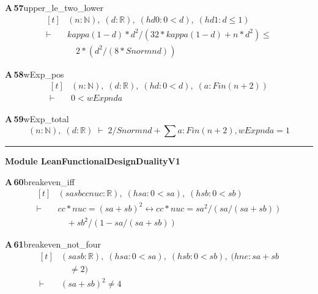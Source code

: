 \documentclass[conference]{IEEEtran}
\theoremstyle{definition}
\newcommand{\lean}[1]{\textsf{\footnotesize #1}}
\begin{document}
\noindent\textbf{A\,57}\quad\lean{upper\_le\_two\_lower}
{\footnotesize\[ \begin{aligned}[t]
&(\mathit{n} : \mathbb{N} ),\; (\mathit{d} : \mathbb{R} ),\; (\mathit{hd0} : 0 < \mathit{d}),\; (\mathit{hd1} : \mathit{d} \leq 1)\\
\vdash\;&\mathit{kappa} (1-\mathit{d})*\mathit{d}^{2}/(32*\mathit{kappa} (1-\mathit{d}) + \mathit{n}*\mathit{d}^{2}) \leq\\
&\quad 2*(\mathit{d}^{2}/(8*\mathit{Snorm} \mathit{n} \mathit{d}))
\end{aligned} \]}

\noindent\textbf{A\,58}\quad\lean{wExp\_pos}
{\footnotesize\[ \begin{aligned}[t]
&(\mathit{n} : \mathbb{N} ),\; (\mathit{d} : \mathbb{R} ),\; (\mathit{hd} : 0 < \mathit{d}),\; (\mathit{a} : \mathit{Fin} (\mathit{n}+2))\\
\vdash\;&0 < \mathit{wExp} \mathit{n} \mathit{d} \mathit{a}
\end{aligned} \]}

\noindent\textbf{A\,59}\quad\lean{wExp\_total}
{\footnotesize\[ (\mathit{n} : \mathbb{N} ),\; (\mathit{d} : \mathbb{R} ) \;\vdash\; 2/\mathit{Snorm} \mathit{n} \mathit{d} + \textstyle\sum \mathit{a} : \mathit{Fin} (\mathit{n}+2), \mathit{wExp} \mathit{n} \mathit{d} \mathit{a} = 1 \]}

\vspace{4pt}\noindent\rule{\columnwidth}{0.4pt}\par\vspace{2pt}
\noindent\textbf{Module \lean{LeanFunctionalDesignDualityV1}}\par\vspace{3pt}

\noindent\textbf{A\,60}\quad\lean{breakeven\_iff}
{\footnotesize\[ \begin{aligned}[t]
&(\mathit{sa} \mathit{sb} \mathit{cc} \mathit{nuc} : \mathbb{R} ),\; (\mathit{hsa} : 0 < \mathit{sa}),\; (\mathit{hsb} : 0 < \mathit{sb})\\
\vdash\;&\mathit{cc} * \mathit{nuc} = (\mathit{sa} + \mathit{sb}) ^{2} \leftrightarrow \mathit{cc} * \mathit{nuc} = \mathit{sa} ^{2} / (\mathit{sa} / (\mathit{sa} + \mathit{sb}))\\
&\quad + \mathit{sb} ^{2} / (1 - \mathit{sa} / (\mathit{sa} + \mathit{sb}))
\end{aligned} \]}

\noindent\textbf{A\,61}\quad\lean{breakeven\_not\_four}
{\footnotesize\[ \begin{aligned}[t]
&(\mathit{sa} \mathit{sb} : \mathbb{R} ),\; (\mathit{hsa} : 0 < \mathit{sa}),\; (\mathit{hsb} : 0 < \mathit{sb}),\; (\mathit{hne} : \mathit{sa} + \mathit{sb}\\
&\quad \neq 2)\\
\vdash\;&(\mathit{sa} + \mathit{sb}) ^{2} \neq 4
\end{aligned} \]}
\end{document}
